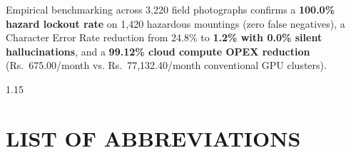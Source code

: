 \documentclass[12pt,a4paper,oneside]{report}
\begin{document}
Empirical benchmarking across 3,220 field photographs confirms a \textbf{100.0\% hazard lockout rate} on 1,420 hazardous mountings (zero false negatives), a Character Error Rate reduction from 24.8\% to \textbf{1.2\% with 0.0\% silent hallucinations}, and a \textbf{99.12\% cloud compute OPEX reduction} (Rs.~675.00/month vs. Rs.~77,132.40/month conventional GPU clusters).

\clearpage

\begin{spacing}{1.15}
\tableofcontents
\thispagestyle{plain}
\clearpage

\listoftables
\thispagestyle{plain}
\clearpage

\listoffigures
\thispagestyle{plain}
\clearpage
\end{spacing}

\chapter*{LIST OF ABBREVIATIONS}
\thispagestyle{plain}
\end{document}
